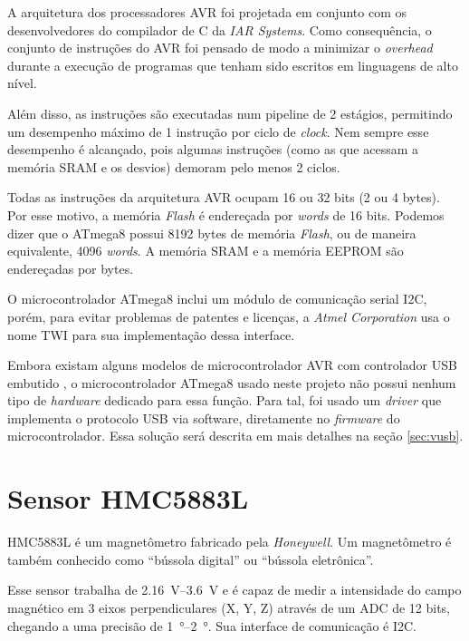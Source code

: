 \documentclass[brazil,pagestart=firstchapter]{abnt}
\begin{document}
A arquitetura dos processadores AVR foi projetada em conjunto com os
desenvolvedores do compilador de C da \textit{IAR Systems}. Como
consequência, o conjunto de instruções do AVR foi pensado de modo a
minimizar o \textit{overhead} durante a execução de programas que tenham
sido escritos em linguagens de alto nível. \cite{avr_iar_design}

Além disso, as instruções são executadas num pipeline de 2 estágios,
permitindo um desempenho máximo de 1 instrução por ciclo de \textit{clock}.
\cite[p.~9]{ATmega8} Nem sempre esse desempenho é alcançado, pois algumas
instruções (como as que acessam a memória \ac{SRAM} e os desvios) demoram
pelo menos 2 ciclos. \cite[p.~282]{ATmega8}

Todas as instruções da arquitetura AVR ocupam 16 ou 32 bits (2 ou 4 bytes).
Por esse motivo, a memória \textit{Flash} é endereçada por \textit{words} de
16 bits. Podemos dizer que o ATmega8 possui \num{8192} bytes de memória
\textit{Flash}, ou de maneira equivalente, \num{4096} \textit{words}.
\cite[p.~17]{ATmega8} A memória \ac{SRAM} e a memória \ac{EEPROM} são
endereçadas por bytes. \cite[p.~18-19]{ATmega8}

O microcontrolador ATmega8 inclui um módulo de comunicação serial \ac{I2C},
porém, para evitar problemas de patentes e licenças, a \textit{Atmel
Corporation} usa o nome \ac{TWI} para sua implementação dessa interface.
\cite{avrlibctwi}

Embora existam alguns modelos de microcontrolador AVR com controlador
\ac{USB} embutido \cite{atmel_avr_product_list}, o microcontrolador ATmega8
usado neste projeto não possui nenhum tipo de \textit{hardware} dedicado
para essa função. Para tal, foi usado um \textit{driver} que implementa o
protocolo \ac{USB} via software, diretamente no \textit{firmware} do
microcontrolador. Essa solução será descrita em mais detalhes na seção
\ref{sec:vusb}.


\section{Sensor HMC5883L}
\label{sec:sensor}

HMC5883L é um magnetômetro fabricado pela \textit{Honeywell}. Um
magnetômetro é também conhecido como ``bússola digital'' ou ``bússola
eletrônica''.

Esse sensor trabalha de \SIrange{2.16}{3.6}{\volt} e é capaz de medir a
intensidade do campo magnético em 3 eixos perpendiculares (X, Y, Z) através
de um \ac{ADC} de 12 bits, chegando a uma precisão de
\SIrange{1}{2}{\degree}. Sua interface de comunicação é \ac{I2C}.
\cite{HMC5883L}
\end{document}
